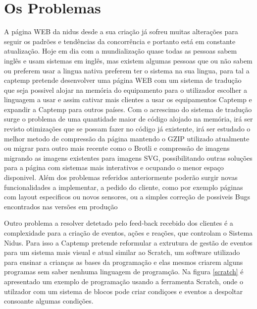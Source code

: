 \section{Os Problemas}
A página WEB da nidus desde a sua criação já sofreu muitas alterações para seguir os padrões e tendências da concorrência e portanto está em constante atualização. Hoje em dia com a mundialização quase todas as pessoas sabem inglês e usam sistemas em inglês, mas existem algumas pessoas que ou não sabem ou preferem usar a lingua nativa preferem ter o sistema na sua lingua, para tal a captemp pretende desenvolver uma página WEB com um sistema de tradução que seja possivel alojar na memória do equipamento para o utilizador escolher a linguagem a usar e assim cativar mais clientes a usar os equipamentos Captemp e expandir a Captemp para outros países. Com o acrescimo do sistema de tradução surge o problema de uma quantidade maior de código alojado na memória, irá ser revisto otimizações que se possam fazer no código já existente, irá ser estudado o melhor metodo de compressão da página mantendo o GZIP utilizado atualmente ou migrar para outro mais recente como o Brotli e compressão de imagens migrando as imagens existentes para imagens SVG, possibilitando outras soluções para a página com sistemas mais interativos e ocupando o menor espaço disponivel. Além dos problemas referidos anteriormente poderão surgir novas funcionalidades a implementar, a pedido do cliente, como por exemplo páginas com layout especificos ou novos sensores, ou a simples correção de possiveis Bugs encontrados nas versões em produção
\par
Outro problema a resolver detetado pelo feed-back recebido dos clientes é a complexidade para a criação de eventos, ações e reações, que controlam o Sistema Nidus. Para isso a Captemp pretende reformular a extrutura de gestão de eventos para um sistema mais visual  e atual similar ao Scratch, um software utilizado para ensinar a crianças as bases da programação e elas mesmos criarem alguns programas sem saber nenhuma linguagem de programção. Na figura \ref{scratch} é apresentado um exemplo de programação usando a ferramenta Scratch, onde o utilzador com um sistema de blocos pode criar condiçoes e eventos a despoltar consoante algumas condições.
